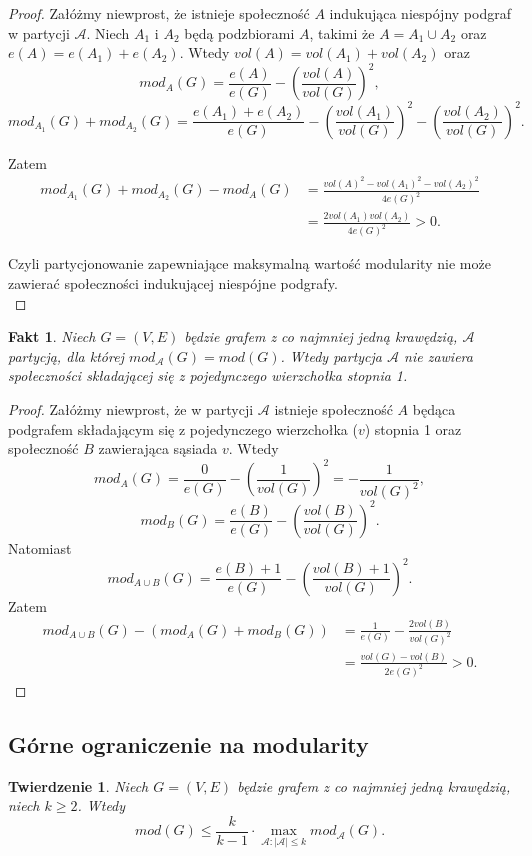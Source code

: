\documentclass[letterpaper,12pt]{article}
\newtheorem{fact}{Fakt}
\newtheorem{theorem}{Twierdzenie}
\begin{document}
\begin{proof}
  Załóżmy niewprost, że istnieje społeczność \(A\) indukująca niespójny podgraf w partycji \(\mathcal{A}\). Niech \(A_1\) i \(A_2\) będą podzbiorami \(A\), takimi że \(A = A_1 \cup A_2\) oraz \(e(A) = e(A_1) + e(A_2)\). Wtedy \(vol(A) = vol(A_1) + vol(A_2)\) oraz
  \[ mod_A(G) = \frac{e(A)}{e(G)} - {\left(\frac{vol(A)}{vol(G)}\right)}^2,\]
  \[ mod_{A_1}(G) + mod_{A_2}(G) = \frac{e(A_1)+e(A_2)}{e(G)} - {\left(\frac{vol(A_1)}{vol(G)}\right)}^2 - {\left(\frac{vol(A_2)}{vol(G)}\right)}^2.\]

  Zatem
  \begin{align*}
    mod_{A_1}(G) + mod_{A_2}(G) - mod_A(G)
     & = \frac{{vol(A)}^2 - {vol(A_1)}^2 - {vol(A_2)}^2}{4e(G)^2} \\
     & = \frac{2vol(A_1)vol(A_2)}{4e(G)^2} > 0.
  \end{align*}

  Czyli partycjonowanie zapewniające maksymalną wartość modularity nie może zawierać społeczności indukującej niespójne podgrafy.\\
\end{proof}

\begin{fact}
  Niech \(G = (V,E)\) będzie grafem z co najmniej jedną krawędzią, \(\mathcal{A}\) partycją, dla której \(mod_{\mathcal{A}}(G) = mod(G)\). Wtedy partycja \(\mathcal{A}\) nie zawiera społeczności składającej się z pojedynczego wierzchołka stopnia 1.
\end{fact}

\begin{proof}
  Załóżmy niewprost, że w partycji \(\mathcal{A}\) istnieje społeczność \(A\) będąca podgrafem składającym się z pojedynczego wierzchołka (\(v\)) stopnia 1 oraz społeczność \(B\) zawierająca sąsiada \(v\). Wtedy
  \[
    mod_A(G) = \frac{0}{e(G)} - {\left(\frac{1}{vol(G)}\right)}^2 = -\frac{1}{vol(G)^2},
  \]
  \[
    mod_B(G) = \frac{e(B)}{e(G)} - {\left(\frac{vol(B)}{vol(G)}\right)}^2.
  \]
  Natomiast
  \[
    mod_{A \cup B}(G) = \frac{e(B)+1}{e(G)} - {\left(\frac{vol(B)+1}{vol(G)}\right)}^2.
  \]
  Zatem
  \begin{align*}
    mod_{A \cup B}(G) - \left(mod_A(G)+mod_B(G)\right)
     & = \frac{1}{e(G)} - \frac{2vol(B)}{vol(G)^2} \\
     & = \frac{vol(G)-vol(B)}{2e(G)^2} > 0.
  \end{align*}
\end{proof}

\subsection{Górne ograniczenie na modularity}
\begin{theorem}
  \label{dinh_thai}
  \cite[Lemma 1]{DT11}
  Niech \(G = (V,E)\) będzie grafem z co najmniej jedną krawędzią, niech \(k \geq 2\). Wtedy
  \[mod(G) \leq \frac{k}{k-1} \cdot \max_{\mathcal{A} : |\mathcal{A}| \leq k} mod_{\mathcal{A}}(G).\]
\end{theorem}
\end{document}
